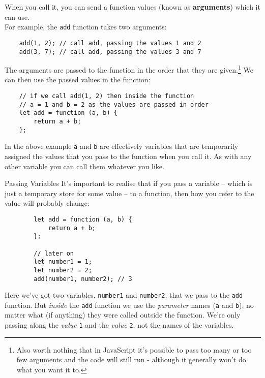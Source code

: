 When you call it, you can send a function values (known as \textbf{arguments}) which it can use.
\\

For example, the \texttt{add} function takes two arguments:

\begin{verbatim}
    add(1, 2); // call add, passing the values 1 and 2
    add(3, 7); // call add, passing the values 3 and 7
\end{verbatim}

The arguments are passed to the function in the order that they are given.\footnote{Also worth nothing that in JavaScript it's possible to pass too many or too few arguments and the code will still run - although it generally won't do what you want it to.} We can then use the passed values in the function:

\begin{verbatim}
    // if we call add(1, 2) then inside the function
    // a = 1 and b = 2 as the values are passed in order
    let add = function (a, b) {
        return a + b;
    };
\end{verbatim}

In the above example \texttt{a} and \texttt{b} are effectively variables that are temporarily assigned the values that you pass to the function when you call it. As with any other variable you can call them whatever you like.

\begin{infobox}{Passing Variables}
    It's important to realise that if you pass a variable – which is just a temporary store for some value – to a function, then how you refer to the value will probably change:

    \begin{verbatim}
        let add = function (a, b) {
            return a + b;
        };

        // later on
        let number1 = 1;
        let number2 = 2;
        add(number1, number2); // 3
    \end{verbatim}

    Here we've got two variables, \texttt{number1} and \texttt{number2}, that we pass to the \texttt{add} function. But \textit{inside} the \texttt{add} function we use the \textit{parameter} names (\texttt{a} and \texttt{b}), no matter what (if anything) they were called outside the function. We're only passing along the \textit{value} \texttt{1} and the \textit{value} \texttt{2}, not the names of the variables.
\end{infobox}

